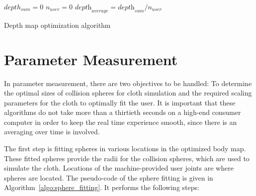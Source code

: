 \begin{algorithm}[ht]
\DontPrintSemicolon %
$depth_{sum}=0$ \;
$n_{user} =0$\;
$\textit{depth}_\textit{average}=\textit{depth}_\textit{sum}/n_\textit{user}$ \;
 
\caption{Depth map optimization algorithm}
\label{algo:depth_patch}
\end{algorithm}

\section{Parameter Measurement}
In parameter measurement, there are two objectives to be handled: To determine the optimal sizes of collision spheres for cloth simulation and the required scaling parameters for the cloth to optimally fit the user. It is important that these algorithms do not take more than a thirtieth seconds on a high-end consumer computer in order to keep the real time experience smooth, since there is an averaging over time is involved.

The first step is fitting spheres in various locations in the optimized body map. These fitted spheres provide the radii for the collision spheres, which are used to simulate the cloth. Locations of the machine-provided user joints are where spheres are located. The pseudo-code of the sphere fitting is given in Algorithm~\ref{algo:sphere_fitting}. It performs the following steps: 

